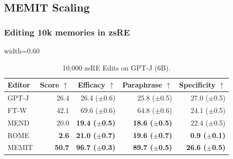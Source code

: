 \documentclass{article} %
\newcommand{\badmetric}[1]{{\color{rred} \textbf{#1}}}
\newcommand{\goodmetric}[1]{{\color{ggreen} \textbf{#1}}}
\newcommand{\method}{MEMIT\xspace}
\begin{document}
\subsection{\method Scaling} \label{subsec:mrome-scaling}

\subsubsection{Editing 10k memories in zsRE}


\addtolength{\tabcolsep}{-3pt}
\begin{table}
    \centering
    \vspace{-35pt}
    \caption{\small 10,000 zsRE Edits on GPT-J (6B).}
    \vspace{1pt}
    \label{tab:zsre-results}
    \scriptsize
    \begin{adjustbox}{width=0.60\textwidth}
    \begin{tabular}{lrrrr}
        \toprule
        \textbf{Editor} & \textbf{Score} $\uparrow$  & \textbf{Efficacy} $\uparrow$ & \textbf{Paraphrase} $\uparrow$ & \textbf{Specificity} $\uparrow$ \\
        \midrule
GPT-J & 26.4 & 26.4 ($\pm$0.6) & 25.8 ($\pm$0.5) & 27.0 ($\pm$0.5)\\\midrule
FT-W & 42.1 & 69.6 ($\pm$0.6) & 64.8 ($\pm$0.6) & 24.1 ($\pm$0.5)\\
MEND & 20.0 & \badmetric{19.4 ($\pm$0.5)} & \badmetric{18.6 ($\pm$0.5)} & 22.4 ($\pm$0.5)\\
ROME & \badmetric{2.6} & \badmetric{21.0 ($\pm$0.7)} & \badmetric{19.6 ($\pm$0.7)} & \badmetric{0.9 ($\pm$0.1)}\\
\method & \goodmetric{50.7} & \goodmetric{96.7 ($\pm$0.3)} & \goodmetric{89.7 ($\pm$0.5)} & \goodmetric{26.6 ($\pm$0.5)}\\
        \bottomrule
    \end{tabular}
    \end{adjustbox}
    \vspace{-10pt}
\end{table}
\addtolength{\tabcolsep}{3pt}
\end{document}
